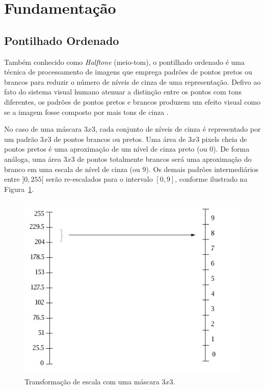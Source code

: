 \documentclass[twoside,twocolumn]{article}
\begin{document}
\section{Fundamentação}

\subsection{Pontilhado Ordenado}

Também conhecido como \textit{Halftone} (meio-tom), o pontilhado ordenado é uma técnica de processamento de imagens que emprega padrões de pontos pretos ou brancos para reduzir o número de níveis de cinza de uma representação. Defivo ao fato do sistema visual humano atenuar a distinção entre os pontos com tons diferentes, os padrões de pontos pretos e brancos produzem um efeito visual como se a imagem fosse composto por mais tons de cinza \cite{b4}.

No caso de uma máscara $3x3$, cada conjunto de níveis de cinza é representado por um padrão $3x3$ de pontos brancos ou pretos. Uma área de $3x3$ pixels cheia de pontos pretos é uma aproximação de um nível de cinza preto (ou 0). De forma análoga, uma área $3x3$ de pontos totalmente brancos será uma aproximação do branco em uma escala de nível de cinza (ou 9). Os demais padrões intermediários entre $]0,255[$ serão re-escalados para o intervalo $[0,9]$, conforme ilustrado na Figura~\ref{escalas}.

\begin{figure}[H]
\begin{center}
	\includegraphics[scale=.009]{figures/escalas.jpg}
\caption{Transformação de escala com uma máscara $3x3$.} \label{escalas}
\end{center}
\end{figure}
\end{document}

